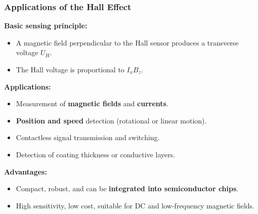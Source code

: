 \begin{frame}
	\frametitle{Applications of the Hall Effect}
    \small
    \textbf{Basic sensing principle:}
    \begin{itemize}
        \item A magnetic field perpendicular to the Hall sensor produces a transverse voltage $U_H$.
        \item The Hall voltage is proportional to $I_x B_z$.
    \end{itemize}
    \textbf{Applications:}
    \begin{itemize}
        \item Measurement of \textbf{magnetic fields} and \textbf{currents}.
        \item \textbf{Position and speed} detection (rotational or linear motion).
        \item Contactless signal transmission and switching.
        \item Detection of coating thickness or conductive layers.
    \end{itemize}
    \textbf{Advantages:}
    \begin{itemize}
        \item Compact, robust, and can be \textbf{integrated into semiconductor chips}.
        \item High sensitivity, low cost, suitable for DC and low-frequency magnetic fields.
    \end{itemize}
\end{frame}

